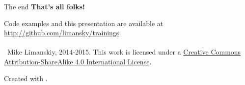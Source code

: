 \begin{frame}{The end}
\centering
\textbf{That's all folks!}

Code examples and this presentation are available at \url{http://github.com/limansky/trainings}\\~\\

\scriptsize{\ccbysa \ Mike Limanskiy, 2014-2015.}
\vfill
\tiny
This work is licensed under a \href{http://creativecommons.org/licenses/by-sa/4.0/}{Creative Commons Attribution-ShareAlike 4.0 International License}.

Created with \LaTeXe.
\end{frame}

